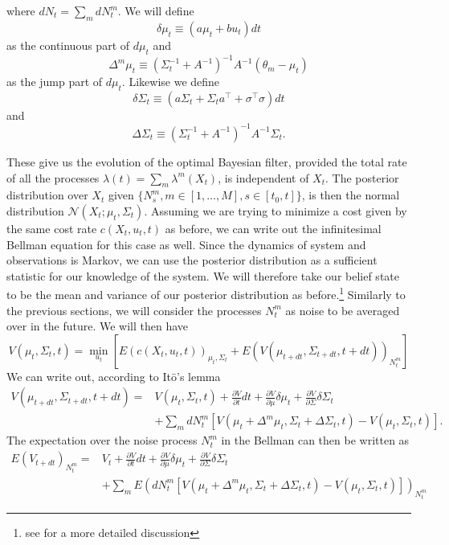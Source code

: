 where $dN_t = \sum_m dN^m_t$. We will define 
$$\delta \mu_t \equiv (a\mu_t + b u_t) dt$$ as the continuous part of $d\mu_t$ and 
$$\Delta^m \mu_t \equiv \left(\Sigma_t^{-1} + A^{-1}\right)^{-1} A^{-1} \left(\theta_m - \mu_t\right)$$ as the jump part of $d\mu_t$. Likewise we define
$$\delta\Sigma_t \equiv (a\Sigma_t + \Sigma_t a^\top + \sigma^\top \sigma)dt$$ and $$\Delta\Sigma_t \equiv \left(\Sigma_t^{-1} + A^{-1}\right)^{-1} A^{-1} \Sigma_t.$$\par
These give us the evolution of the optimal Bayesian filter, provided the total rate of all the processes $\lambda (t) = \sum_m \lambda^m(X_t)$, is independent of $X_t$. The posterior distribution over $X_t$ given $\{N^m_s, m\in [1,\ldots,M], s\in[t_0,t]\}$, is then the normal distribution $\mathcal{N}(X_t;\mu_t,\Sigma_t)$. Assuming we are trying to minimize a cost given by the same cost rate $c(X_t,u_t,t)$ as before, we can write out the infinitesimal Bellman equation for this case as well. Since the dynamics of system and observations is Markov, we can use the posterior distribution as a sufficient statistic for our knowledge of the system. We will therefore take our belief state to be the mean and variance of our posterior distribution as before.\footnote{see \citep{bertsekas2012} for a more detailed discussion}
Similarly to the previous sections, we will consider the processes $N^m_t$ as noise to be averaged over in the future. We will then have
$$
V(\mu_t,\Sigma_t,t)= \min_{u_t} \left[E\left(c(X_t,u_t,t)\right)_{\mu_t,\Sigma_t} + E\left(V(\mu_{t+dt},\Sigma_{t+dt},t+dt)\right)_{N^m_t}\right]
$$
We can write out, according to It\=o's lemma
\begin{eqnarray*}
V(\mu_{t+dt},\Sigma_{t+dt},t+dt) =& V(\mu_t,\Sigma_t,t) + \frac{\partial V}{\partial t}dt + \frac{\partial V}{\partial \mu} \delta\mu_t +\frac{\partial V}{\partial \Sigma} \delta \Sigma_t\\ &+ \sum_m dN^m_t\left[V\left(\mu_t +\Delta^m\mu_t , \Sigma_t+\Delta\Sigma_t,t\right)-V(\mu_t,\Sigma_t,t)\right].
\end{eqnarray*}
The expectation over the noise process $N^m_t$ in the Bellman can then be written as
\begin{eqnarray*}
E(V_{t+dt})_{N^m_t} =&V_t + \frac{\partial V}{\partial t}dt + \frac{\partial V}{\partial \mu} \delta\mu_t +\frac{\partial V}{\partial \Sigma} \delta \Sigma_t\\ &+ \sum_m E\left(dN^m_t\left[V\left(\mu_t +\Delta^m\mu_t , \Sigma_t+\Delta\Sigma_t,t\right)-V(\mu_t,\Sigma_t,t)\right]\right)_{N^m_t} 
\end{eqnarray*}
